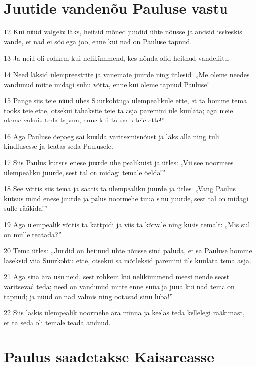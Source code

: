 \section*{Juutide vandenõu Pauluse vastu}

\par 12 Kui nüüd valgeks läks, heitsid mõned juudid ühte nõusse ja andsid isekeskis vande, et nad ei söö ega joo, enne kui nad on Pauluse tapnud.
\par 13 Ja neid oli rohkem kui nelikümmend, kes nõnda olid heitnud vandeliitu.
\par 14 Need läksid ülempreestrite ja vanemate juurde ning ütlesid: „Me oleme needes vandunud mitte midagi suhu võtta, enne kui oleme tapnud Pauluse!
\par 15 Pange siis teie nüüd ühes Suurkohtuga ülempealikule ette, et ta homme tema tooks teie ette, otsekui tahaksite teie ta asja paremini üle kuulata; aga meie oleme valmis teda tapma, enne kui ta saab teie ette!”
\par 16 Aga Pauluse õepoeg sai kuulda varitsemisnõust ja läks alla ning tuli kindlusesse ja teatas seda Paulusele.
\par 17 Siis Paulus kutsus enese juurde ühe pealikuist ja ütles: „Vii see noormees ülempealiku juurde, sest tal on midagi temale öelda!”
\par 18 See võttis siis tema ja saatis ta ülempealiku juurde ja ütles: „Vang Paulus kutsus mind enese juurde ja palus noormehe tuua sinu juurde, sest tal on midagi sulle rääkida!”
\par 19 Aga ülempealik võttis ta kättpidi ja viis ta kõrvale ning küsis temalt: „Mis sul on mulle teatada?”
\par 20 Tema ütles: „Juudid on heitnud ühte nõusse sind paluda, et sa Pauluse homme laseksid viia Suurkohtu ette, otsekui sa mõtleksid paremini üle kuulata tema asja.
\par 21 Aga sina ära usu neid, sest rohkem kui nelikümmend meest nende seast varitsevad teda; need on vandunud mitte enne süüa ja juua kui nad tema on tapnud; ja nüüd on nad valmis ning ootavad sinu luba!”
\par 22 Siis laskis ülempealik noormehe ära minna ja keelas teda kellelegi rääkimast, et ta seda oli temale teada andnud.

\section*{Paulus saadetakse Kaisareasse}

